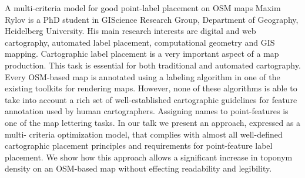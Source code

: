 %
{A multi-criteria model for good point-label placement on OSM maps}%
{Maxim Rylov is a PhD student in GIScience Research Group, Department of Geography, Heidelberg University. His main research interests are digital and web cartography, automated label placement, computational geometry and GIS mapping.}%
{Cartographic label placement is a very important aspect of a map production. This task is essential for both traditional and automated cartography. Every OSM-based map is annotated using a labeling algorithm in one of the existing toolkits for rendering maps. However, none of these algorithms is able to take into account a rich set of well-established cartographic guidelines for feature annotation used by human cartographers. Assigning names to point-features is one of the map lettering tasks. In our talk we present an approach, expressed as a multi-
criteria optimization model, that complies with almost all well-defined cartographic placement principles and requirements for point-feature label placement. We show how this approach allows a significant increase in toponym density on an OSM-based map without effecting readability and legibility.}

